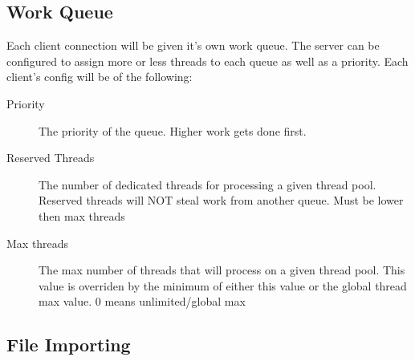 \documentclass[11pt]{article}
\begin{document}
	\subsection[work-queue]{Work Queue}
	Each client connection will be given it's own work queue. The server can be configured to assign more or less threads to each queue as well as a priority.
	Each client's config will be of the following:
	\begin{description}
		\item[Priority] The priority of the queue. Higher work gets done first. 
		\item[Reserved Threads] The number of dedicated threads for processing a given thread pool. Reserved threads will NOT steal work from another queue. Must be lower then max threads
		\item[Max threads] The max number of threads that will process on a given thread pool. This value is overriden by the minimum of either this value or the global thread max value. 0 means unlimited/global max
	\end{description}

	


	\subsection[file-importing]{File Importing}
	



   
\end{document}
